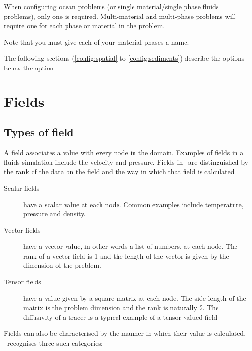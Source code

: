 When configuring ocean problems (or single material/single phase fluids
problems), only one  is required.  Multi-material
and multi-phase problems will require one  for each
phase or material in the problem.

Note that you must give each of your material phases a name.

The following sections (\ref{config:spatial} to \ref{config:sediments}) describe the options below the
 option.

\section{Fields}
\subsection{Types of field}

A field associates a value with every node in the domain. Examples of fields
in a fluids simulation include the velocity and pressure. Fields in \fluidity\
are distinguished by the rank of the data on the field and the way in which
that field is calculated. 

\begin{description}
\item[Scalar fields] have a scalar value at each node. Common examples
  include temperature, pressure and density.
\item[Vector fields] have a vector value, in other words a list of numbers,
  at each node. The rank of a vector field is 1 and the length of the
  vector is given by the dimension of the problem.
\item[Tensor fields] have a value given by a square matrix at each
  node. The side length of the matrix is the problem dimension and the rank
  is naturally 2. The diffusivity of a tracer is a typical example of a
  tensor-valued field.
\end{description}

Fields can also be characterised by the manner in which their value is
calculated. \fluidity\ recognises three such categories:

